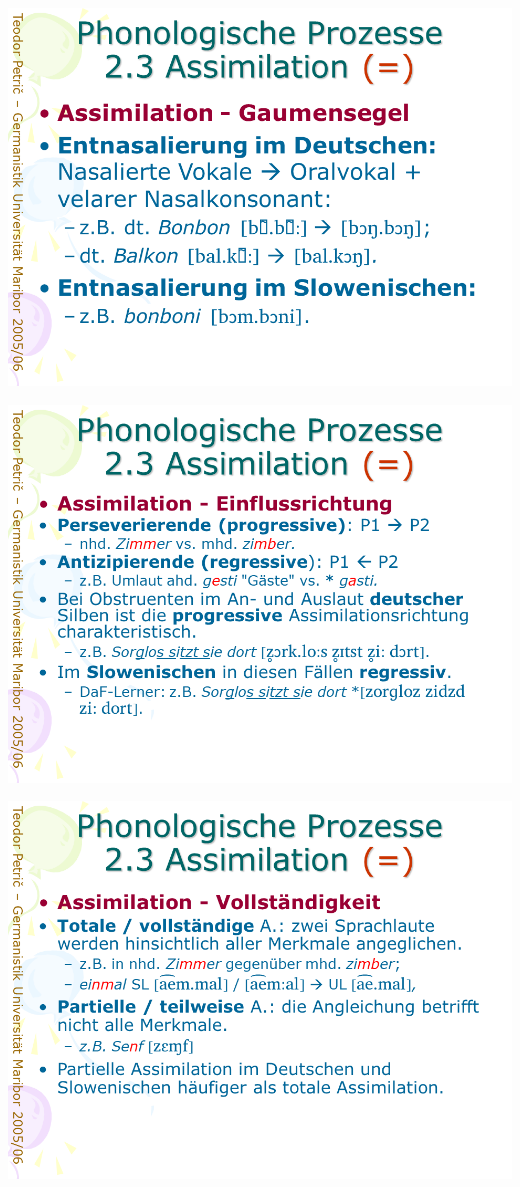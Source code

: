 \documentclass[
  letterpaper,
]{scrbook}
\begin{document}
\includegraphics[width=1\textwidth,height=\textheight]{./pictures/prozesse/prozesse_36.PNG}

\includegraphics[width=1\textwidth,height=\textheight]{./pictures/prozesse/prozesse_37.PNG}

\includegraphics[width=1\textwidth,height=\textheight]{./pictures/prozesse/prozesse_38.PNG}
\end{document}

